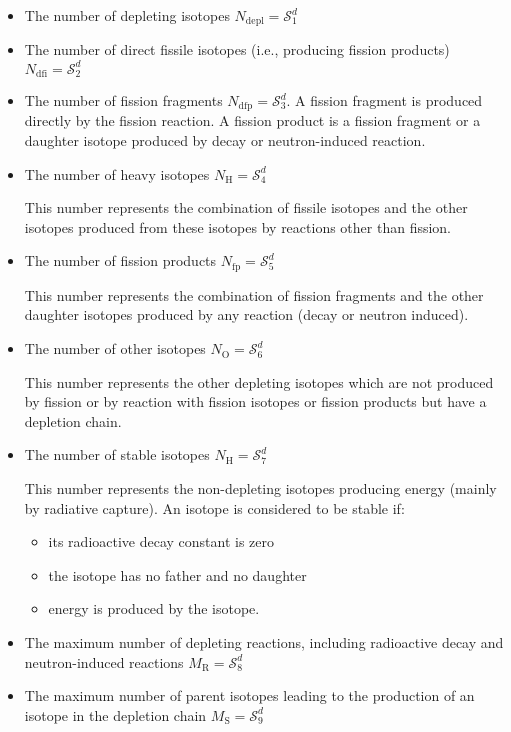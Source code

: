 \begin{itemize}
\item The number of depleting isotopes $N_{\mathrm{depl}}=\mathcal{S}^{d}_{1}$
\item The number of direct fissile isotopes (i.e., producing fission products) $N_{\mathrm{dfi}}=\mathcal{S}^{d}_{2}$
\item The number of fission fragments $N_{\mathrm{dfp}}=\mathcal{S}^{d}_{3}$. A fission fragment is produced directly by the
fission reaction. A fission product is a fission fragment or a daughter isotope
produced by decay or neutron-induced reaction.
\item The number of heavy isotopes $N_{\mathrm{H}}=\mathcal{S}^{d}_{4}$ 

This number represents the combination of fissile isotopes and the other isotopes produced from
these isotopes by reactions other than fission.

\item The number of fission products $N_{\mathrm{fp}}=\mathcal{S}^{d}_{5}$ 

This number represents the combination of fission fragments and the other
daughter isotopes produced by any reaction (decay or neutron induced).

\item The number of other isotopes $N_{\mathrm{O}}=\mathcal{S}^{d}_{6}$ 

This number represents the other depleting isotopes which are not produced by fission or by reaction
with fission isotopes or fission products but have a depletion chain.

\item The number of stable isotopes $N_{\mathrm{H}}=\mathcal{S}^{d}_{7}$ 

This number represents the non-depleting isotopes producing energy (mainly
by radiative capture). An isotope is considered to be stable if:
\begin{itemize}
\item its radioactive decay constant is zero
\item the isotope has no father and no daughter
\item energy is produced by the isotope.
\end{itemize}

\item The maximum number of depleting reactions, including radioactive decay and
neutron-induced reactions $M_{\mathrm{R}}=\mathcal{S}^{d}_{8}$ 

\item The maximum number of parent isotopes leading to the production of an isotope in the
depletion chain $M_{\mathrm{S}}=\mathcal{S}^{d}_{9}$ 

\end{itemize}

